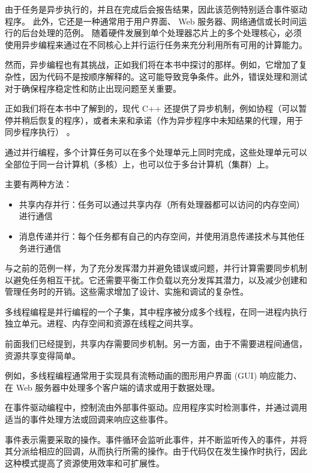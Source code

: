 由于任务是异步执行的，并且在完成后会报告结果，因此该范例特别适合事件驱动程序。
此外，它还是一种通常用于用户界面、 Web 服务器、网络通信或长时间运行的后台处理的范例。
随着硬件发展到单个处理器芯片上的多个处理核心，必须使用异步编程来通过在不同核心上并行运行任务来充分利用所有可用的计算能力。

然而，异步编程也有其挑战，正如我们将在本书中探讨的那样。例如，它增加了复杂性，因为代码不是按顺序解释的。这可能导致竞争条件。此外，错误处理和测试对于确保程序稳定性和防止出现问题至关重要。

正如我们将在本书中了解到的，现代 C++ 还提供了异步机制，例如协程（可以暂停并稍后恢复的程序），或者未来和承诺（作为异步程序中未知结果的代理，用于同步程序执行） 。


通过并行编程，多个计算任务可以在多个处理单元上同时完成，这些处理单元可以全部位于同一台计算机（多核）上，也可以位于多台计算机（集群）上。

主要有两种方法：

\begin{itemize}
\item
共享内存并行：任务可以通过共享内存（所有处理器都可以访问的内存空间）进行通信

\item
消息传递并行：每个任务都有自己的内存空间，并使用消息传递技术与其他任务进行通信
\end{itemize}

与之前的范例一样，为了充分发挥潜力并避免错误或问题，并行计算需要同步机制以避免任务相互干扰。它还需要平衡工作负载以充分发挥其潜力，以及减少创建和管理任务时的开销。这些需求增加了设计、实施和调试的复杂性。


多线程编程是并行编程的一个子集，其中程序被分成多个线程，在同一进程内执行独立单元。进程、内存空间和资源在线程之间共享。

前面我们已经提到，共享内存需要同步机制。另一方面，由于不需要进程间通信，资源共享变得简单。

例如，多线程编程通常用于实现具有流畅动画的图形用户界面 (GUI) 响应能力、在 Web 服务器中处理多个客户端的请求或用于数据处理。


在事件驱动编程中，控制流由外部事件驱动。应用程序实时检测事件，并通过调用适当的事件处理方法或回调来响应这些事件。

事件表示需要采取的操作。事件循环会监听此事件，并不断监听传入的事件，并将其分派给相应的回调，从而执行所需的操作。由于代码仅在发生操作时执行，因此这种模式提高了资源使用效率和可扩展性。

